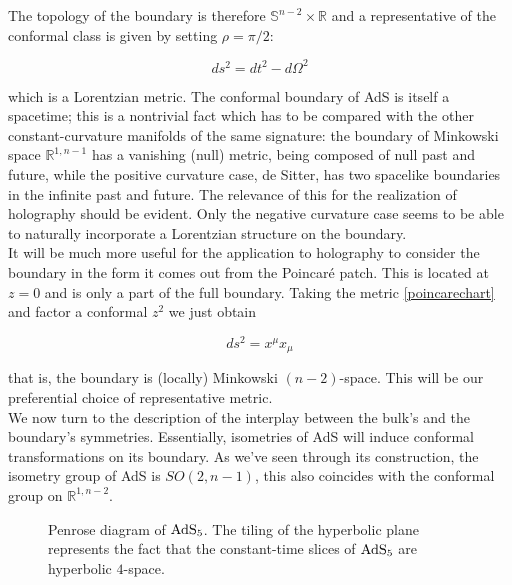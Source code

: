 The topology of the boundary is therefore $\mathbb{S}^{n-2} \times \mathbb{R}$ and a representative of the conformal class is given by setting $\rho = \pi/2$:

\begin{equation}
	ds^2 = dt^2 - d\Omega^2 
\end{equation}

which is a Lorentzian metric. The conformal boundary of AdS is itself a spacetime; this is a nontrivial fact which has to be compared with the other constant-curvature manifolds of the same signature: the boundary of Minkowski space $\mathbb{R}^{1,n-1}$ has a vanishing (null) metric, being composed of null past and future, while the positive curvature case, de Sitter, has two spacelike boundaries in the infinite past and future. The relevance of this for the realization of holography should be evident. Only the negative curvature case seems to be able to naturally incorporate a Lorentzian structure on the boundary.\\

It will be much more useful for the application to holography to consider the boundary in the form it comes out from the Poincaré patch. This is located at $z=0$ and is only a part of the full boundary. Taking the metric \ref{poincarechart} and factor a conformal $z^2$ we just obtain

\begin{equation}
	ds^2 = x^\mu x_\mu
\end{equation}

that is, the boundary is (locally) Minkowski $(n-2)$-space. This will be our preferential choice of representative metric.\\

We now turn to the description of the interplay between the bulk's and the boundary's symmetries. Essentially, isometries of AdS will induce conformal transformations on its boundary. As we've seen through its construction, the isometry group of AdS is $SO(2,n-1)$, this also coincides with the conformal group on $\mathbb{R}^{1,n-2}$.


\begin{figure}
\centering
\def\svgwidth{200pt}
\captionsetup{width=0.8\textwidth}

\caption{Penrose diagram of $\operatorname{AdS}_{5}$. The tiling of the hyperbolic plane represents the fact that the constant-time slices of $\operatorname{AdS}_{5}$ are hyperbolic $4$-space.}
\end{figure}


